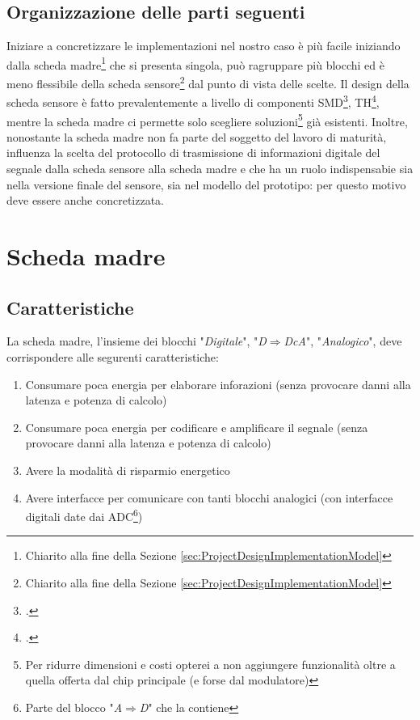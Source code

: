 \documentclass[a4paper, 10pt, final]{article} %
\begin{document}
    \subsection{Organizzazione delle parti seguenti}
    Iniziare a concretizzare le implementazioni nel nostro caso \`{e} pi\`{u} facile iniziando dalla scheda madre\footnote{Chiarito alla fine della Sezione \ref{sec:ProjectDesignImplementationModel}} che si presenta singola, pu\`{o} ragruppare pi\`{u} blocchi ed \`{e} meno flessibile della scheda sensore\footnote{Chiarito alla fine della Sezione \ref{sec:ProjectDesignImplementationModel}} dal punto di vista delle scelte.
    Il design della scheda sensore \`{e} fatto prevalentemente a livello di componenti SMD\footcite[]{SMT:Wiki}, TH\footcite[]{THT:Wiki}, mentre la scheda madre ci permette solo scegliere soluzioni\footnote{Per ridurre dimensioni e costi opterei a non aggiungere funzionalit\`{a} oltre a quella offerta dal chip principale (e forse dal modulatore)} gi\`{a} esistenti.
    Inoltre, nonostante la scheda madre non fa parte del soggetto del lavoro di maturit\`{a}, influenza la scelta del protocollo di trasmissione di informazioni digitale del segnale dalla scheda sensore alla scheda madre e che ha un ruolo indispensabie sia nella versione finale del sensore, sia nel modello del prototipo: per questo motivo deve essere anche concretizzata.

    \section{Scheda madre}\label{sec:Motherboard}
    \begin{samepage}
        \subsection{Caratteristiche}\label{sec:MotherboardCharacteristics}
            La scheda madre, l'insieme dei blocchi "\emph{Digitale}", "\emph{D$\Rightarrow$DcA}", "\emph{Analogico}", deve corrispondere alle segurenti caratteristiche:
            \begin{enumerate}[label=\emph{(\arabic*)}]
                \item Consumare poca energia per elaborare inforazioni (senza provocare danni alla latenza e potenza di calcolo)
                \item Consumare poca energia per codificare e amplificare il segnale (senza provocare danni alla latenza e potenza di calcolo)
                \item Avere la modalit\`{a} di risparmio energetico
                \item Avere interfacce per comunicare con tanti blocchi analogici (con interfacce digitali date dai ADC\footnote{Parte del blocco "\emph{A$\Rightarrow$D}" che la contiene})
            \end{enumerate}
    \end{samepage}
\end{document}
